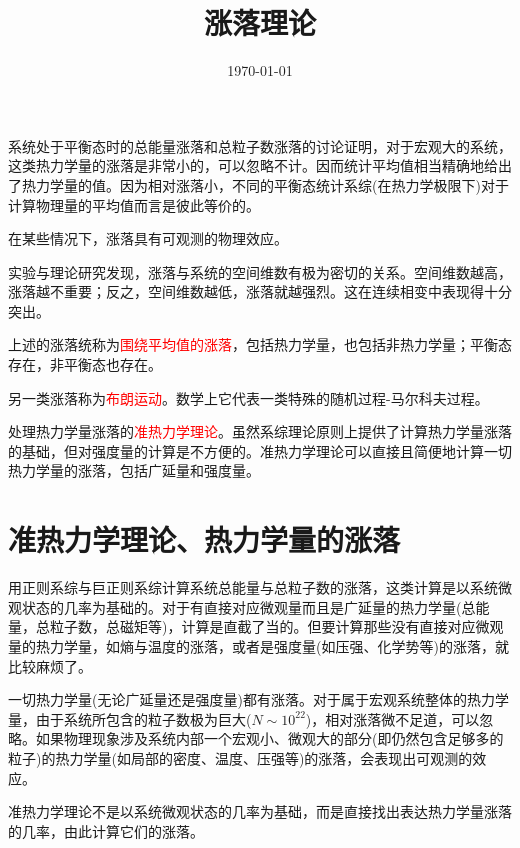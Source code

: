 \documentclass[11pt,a4paper]{article}
\title{涨落理论}
\author{}
\date{\today}
\begin{document}
\maketitle

\cite{2007热力学与统计物理学} 系统处于平衡态时的总能量涨落和总粒子数涨落的讨论证明，对于宏观大的系统，这类热力学量的涨落是非常小的，可以忽略不计。因而统计平均值相当精确地给出了热力学量的值。因为相对涨落小，不同的平衡态统计系综(在热力学极限下)对于计算物理量的平均值而言是彼此等价的。

在某些情况下，涨落具有可观测的物理效应。

实验与理论研究发现，涨落与系统的空间维数有极为密切的关系。空间维数越高，涨落越不重要；反之，空间维数越低，涨落就越强烈。这在连续相变中表现得十分突出。

上述的涨落统称为\textcolor{red}{围绕平均值的涨落}，包括热力学量，也包括非热力学量；平衡态存在，非平衡态也存在。

另一类涨落称为\textcolor{red}{布朗运动}。数学上它代表一类特殊的随机过程-马尔科夫过程。

处理热力学量涨落的\textcolor{red}{准热力学理论}。虽然系综理论原则上提供了计算热力学量涨落的基础，但对强度量的计算是不方便的。准热力学理论可以直接且简便地计算一切热力学量的涨落，包括广延量和强度量。

\section{准热力学理论、热力学量的涨落}
\cite{2007热力学与统计物理学} 用正则系综与巨正则系综计算系统总能量与总粒子数的涨落，这类计算是以系统微观状态的几率为基础的。对于有直接对应微观量而且是广延量的热力学量(总能量，总粒子数，总磁矩等)，计算是直截了当的。但要计算那些没有直接对应微观量的热力学量，如熵与温度的涨落，或者是强度量(如压强、化学势等)的涨落，就比较麻烦了。

一切热力学量(无论广延量还是强度量)都有涨落。对于属于宏观系统整体的热力学量，由于系统所包含的粒子数极为巨大($N \sim 10^{22}$)，相对涨落微不足道，可以忽略。如果物理现象涉及系统内部一个宏观小、微观大的部分(即仍然包含足够多的粒子)的热力学量(如局部的密度、温度、压强等)的涨落，会表现出可观测的效应。


准热力学理论不是以系统微观状态的几率为基础，而是直接找出表达热力学量涨落的几率，由此计算它们的涨落。
\end{document}

